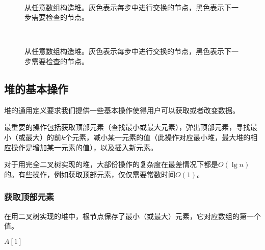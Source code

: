 \documentclass[UTF8]{article}
\begin{document}
\begin{figure}[htbp]
    \centering
     \\
    \caption{从任意数组构造堆。灰色表示每步中进行交换的节点，黑色表示下一步需要检查的节点。} \label{fig:build-heap-2}
\end{figure}

\begin{figure}[htbp]
    \centering
     \\
    \caption{从任意数组构造堆。灰色表示每步中进行交换的节点，黑色表示下一步需要检查的节点。} \label{fig:build-heap-3}
\end{figure}

\subsection{堆的基本操作}

堆的通用定义要求我们提供一些基本操作使得用户可以获取或者改变数据。

最重要的操作包括获取顶部元素（查找最小或最大元素），弹出顶部元素，寻找最小（或最大）的前$k$个元素，减小某一元素的值（此操作对应最小堆，最大堆的相应操作是增加某一元素的值），以及插入新元素。

对于用完全二叉树实现的堆，大部份操作的复杂度在最差情况下都是$O(\lg n)$的。有些操作，例如获取顶部元素，仅仅需要常数时间$O(1)$。

\subsubsection{获取顶部元素}

在用二叉树实现的堆中，根节点保存了最小（或最大）元素，它对应数组的第一个值。

\begin{algorithmic}[1]
  \State \Return $A[1]$
\EndFunction
\end{algorithmic}
\end{document}
